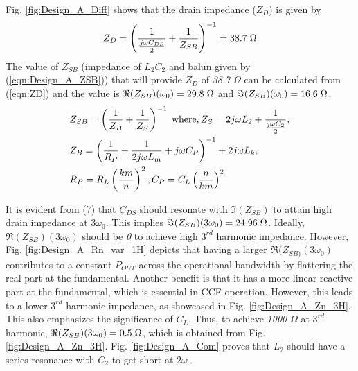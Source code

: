 \documentclass[conference]{IEEEtran}
\begin{document}
Fig. \ref{fig:Design_A_Diff} shows that the drain impedance ($Z_D$) is given by
\vspace{-0.05in}
\begin{equation}
    Z_D=\left(\frac{1}{\frac{j\omega C_{DS}}{2}}+\frac{1}{Z_{SB}}\right)^{-1}=38.7 \hspace{1mm} \Omega
    \label{eqn:ZD}
\end{equation}
The value of $Z_{SB}$ (impedance of $L_2C_2$ and balun given by (\ref{eqn:Design_A_ZSB})) that will provide $Z_D$ of \textit{38.7} $\Omega$ can be calculated from (\ref{eqn:ZD}) and the value is $\Re(Z_{SB})(\omega_0) =  29.8\hspace{1mm} \Omega$ and $\Im(Z_{SB})(\omega_0) = 16.6\hspace{1mm}\Omega$.
\vspace{-0.05in}
\begin{equation}
\begin{aligned}
    &Z_{SB}=\left(\frac{1}{Z_B}+\frac{1}{Z_S}\right)^{-1}
    \hspace{1mm}\text{where}, Z_S=2j\omega  L_2+\frac{1}{\frac{j \omega C_2}{2}}, \\
    &Z_B=\left(\frac{1}{R_P}+\frac{1}{2j \omega  L_m}+j \omega C_P\right)^{-1}+2j \omega  L_k,\\ &R_P=R_L\left(\frac{km}{n}\right)^2,C_P=C_L\left(\frac{n}{km}\right)^2
\label{eqn:Design_A_ZSB}
\end{aligned}
\end{equation}

It is evident from (7) that $C_{DS}$ should resonate with $\Im(Z_{SB})$ to attain high drain impedance at $3\omega_0$. This implies $\Im(Z_{SB})(3\omega_0) = 24.96\hspace{1mm}\Omega$. Ideally, $\Re(Z_{SB})(3\omega_0)$ should be \textit{0} to achieve high $3^{rd}$ harmonic impedance. However, Fig. \ref{fig:Design_A_Rn_var_1H} depicts that having a larger $\Re(Z_{SB)}(3\omega_0)$ contributes to a constant $P_{OUT}$ across the operational bandwidth by flattering the real part at the fundamental. Another benefit is that it has a  more linear reactive part at the fundamental, which is essential in CCF operation.
However, this leads to a lower $3^{rd}$ harmonic impedance, as showcased in Fig. \ref{fig:Design_A_Zn_3H}. This also emphasizes  the significance of $C_L$. Thus, to achieve \textit{1000} $\Omega$ at $3^{rd}$ harmonic,  $\Re(Z_{SB})(3\omega_0) = 0.5\hspace{1mm}\Omega$, which is obtained from Fig. \ref{fig:Design_A_Zn_3H}. Fig. \ref{fig:Design_A_Com} proves that $L_2$ should have a series resonance with $C_2$ to get short at 2$\omega_0$.
\end{document}
